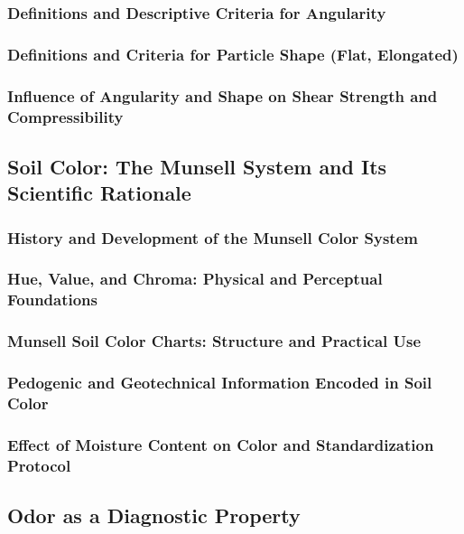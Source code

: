 \subsubsection{Definitions and Descriptive Criteria for Angularity}

\subsubsection{Definitions and Criteria for Particle Shape (Flat, Elongated)}

\subsubsection{Influence of Angularity and Shape on Shear Strength and Compressibility}

\subsection{Soil Color: The Munsell System and Its Scientific Rationale}

\subsubsection{History and Development of the Munsell Color System}

\subsubsection{Hue, Value, and Chroma: Physical and Perceptual Foundations}

\subsubsection{Munsell Soil Color Charts: Structure and Practical Use}

\subsubsection{Pedogenic and Geotechnical Information Encoded in Soil Color}

\subsubsection{Effect of Moisture Content on Color and Standardization Protocol}

\subsection{Odor as a Diagnostic Property}

